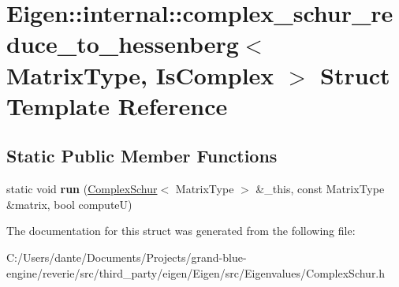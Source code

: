 \hypertarget{struct_eigen_1_1internal_1_1complex__schur__reduce__to__hessenberg}{}\section{Eigen\+::internal\+::complex\+\_\+schur\+\_\+reduce\+\_\+to\+\_\+hessenberg$<$ Matrix\+Type, Is\+Complex $>$ Struct Template Reference}
\label{struct_eigen_1_1internal_1_1complex__schur__reduce__to__hessenberg}
\subsection*{Static Public Member Functions}
\begin{DoxyCompactItemize}
\item 
\mbox{\label{struct_eigen_1_1internal_1_1complex__schur__reduce__to__hessenberg_a385fdf7234ee42f1d0d316ebfd142338}} 
static void {\bfseries run} (\mbox{\hyperlink{class_eigen_1_1_complex_schur}{Complex\+Schur}}$<$ Matrix\+Type $>$ \&\+\_\+this, const Matrix\+Type \&matrix, bool computeU)
\end{DoxyCompactItemize}


The documentation for this struct was generated from the following file\+:\begin{DoxyCompactItemize}
\item 
C\+:/\+Users/dante/\+Documents/\+Projects/grand-\/blue-\/engine/reverie/src/third\+\_\+party/eigen/\+Eigen/src/\+Eigenvalues/Complex\+Schur.\+h\end{DoxyCompactItemize}
